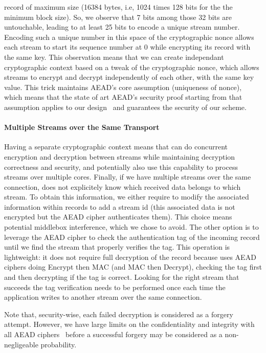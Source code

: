 record of maximum size (16384 bytes, i.e, 1024 times 128 bits for the the
minimum block size). So, we observe that 7 bits among those 32 bits are
untouchable, leading to at least 25 bits to encode a unique stream number.
Encoding such a unique number in this space of the cryptographic nonce allows
each stream to start its sequence number at 0 while encrypting its record with
the same key. This observation means that we can create independant
cryptographic context based on a tweak of the cryptographic nonce, which allows
streams to encrypt and decrypt independently of each other, with the same key
value. This trick maintains AEAD's core assumption (uniqueness of nonce), which
means that the state of art AEAD's security proof starting from that assumption
applies to our design~\cite{chatterjee2011another} and guarantees the security
of our scheme.

\paragraph*{Multiple Streams over the Same Transport}
Having a separate cryptographic context means that \tcpls can do concurrent
encryption and decryption between streams while maintaining decryption
correctness and security, and potentially also use this capability to process
streams over multiple cores. Finally, if we have multiple streams over the same
\tcp connection, \tcpls does not explicitely know which received data belongs to
which stream. To obtain this information, we either require to modify the
associated information within \tls records to add a stream id (this associated
data is not encrypted but the AEAD cipher authenticates them). This choice
means potential middlebox interference, which we chose to avoid. The other
option is to leverage the AEAD cipher to check the authentication tag of the
incoming record until we find the stream that properly verifies the tag. This
operation is lightweight: it does not require full decryption of the record
because  uses AEAD ciphers doing Encrypt then MAC (and MAC then
Decrypt), checking the tag first and then decrypting if the tag is correct.
Looking for the right stream that succeeds the tag verification needs to be
performed once each time the application writes to another stream over the same
\tcp connection.

Note that, security-wise, each failed decryption is considered as a
forgery attempt. However, we have large limits on the confidentiality and
integrity with all AEAD ciphers~\cite{luykx2015limits, aeadlimits} before a
successful forgery may be considered as a non-negligeable probability.

